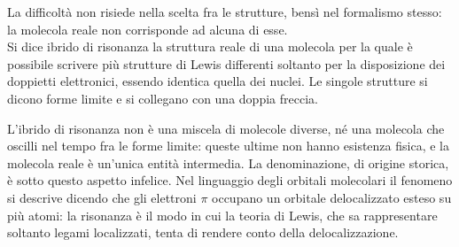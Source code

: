 La difficoltà non risiede nella scelta fra le strutture, bensì nel formalismo stesso: la molecola reale non corrisponde ad alcuna di esse.\\

Si dice ibrido di risonanza la struttura reale di una molecola per la quale è possibile scrivere più strutture di Lewis differenti soltanto per la disposizione dei doppietti elettronici, essendo identica quella dei nuclei. Le singole strutture si dicono forme limite e si collegano con una doppia freccia.\\

\begin{center}
\end{center}

\newpage

L'ibrido di risonanza non è una miscela di molecole diverse, né una molecola che oscilli nel tempo fra le forme limite: queste ultime non hanno esistenza fisica, e la molecola reale è un'unica entità intermedia. La denominazione, di origine storica, è sotto questo aspetto infelice. Nel linguaggio degli orbitali molecolari il fenomeno si descrive dicendo che gli elettroni $\pi$ occupano un orbitale delocalizzato esteso su più atomi: la risonanza è il modo in cui la teoria di Lewis, che sa rappresentare soltanto legami localizzati, tenta di rendere conto della delocalizzazione.\\

